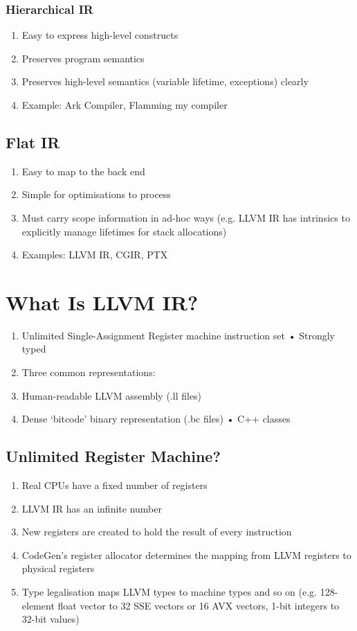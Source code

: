 \documentclass[a4paper]{article}
\theoremstyle{definition}
\begin{document}
\subsubsection{Hierarchical IR}
\begin{enumerate}
\item  Easy to express high-level constructs
\item Preserves program semantics
\item Preserves high-level semantics (variable lifetime, exceptions) clearly
\item Example: Ark Compiler, Flamming my compiler
\end{enumerate}
\subsection{Flat IR}

\begin{enumerate}
  \item Easy to map to the back end
  \item Simple for optimisations to process
  \item Must carry scope information in ad-hoc ways (e.g. LLVM IR has intrinsics to explicitly manage lifetimes for stack allocations)
  \item Examples: LLVM IR, CGIR, PTX
\end{enumerate}
\section{What Is LLVM IR?}
\begin{enumerate}
  \item Unlimited Single-Assignment Register machine instruction set • Strongly typed
  \item Three common representations:
  \item Human-readable LLVM assembly (.ll files)
  \item Dense ‘bitcode’ binary representation (.bc files) • C++ classes
\end{enumerate}

\subsection{Unlimited Register Machine?}

\begin{enumerate}
  \item  Real CPUs have a fixed number of registers
  \item LLVM IR has an infinite number
  \item New registers are created to hold the result of every instruction
  \item CodeGen’s register allocator determines the mapping from LLVM registers to physical registers
  \item Type legalisation maps LLVM types to machine types and so on (e.g. 128-element float vector to 32 SSE vectors or 16 AVX vectors, 1-bit integers to 32-bit values)
\end{enumerate}
\end{document}
